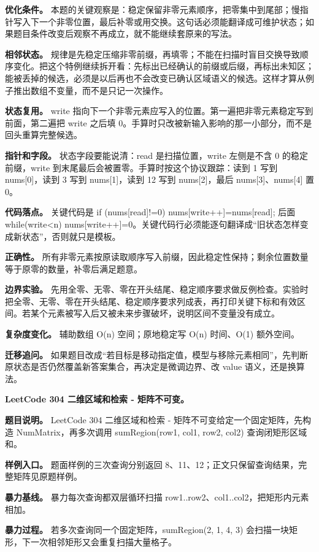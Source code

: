 \textbf{优化条件。} 本题的关键观察是：稳定保留非零元素顺序，把零集中到尾部；慢指针写入下一个非零位置，最后补零或用交换。这句话必须能翻译成可维护状态；如果题目条件改变后观察不再成立，就不能继续套原来的写法。

\textbf{相邻状态。} 规律是先稳定压缩非零前缀，再填零；不能在扫描时盲目交换导致顺序变化。把这个特例继续拆开看：先标出已经确认的前缀或后缀，再标出未知区；能被丢掉的候选，必须是以后再也不会改变已确认区域语义的候选。这样才算从例子推出数组不变量，而不是只记一次操作。

\textbf{状态复用。} write 指向下一个非零元素应写入的位置。第一遍把非零元素稳定写到前面，第二遍把 write 之后填 0。手算时只改被新输入影响的那一小部分，而不是回头重算完整候选。

\textbf{指针和字段。} 状态字段要能说清：read 是扫描位置，write 左侧是不含 0 的稳定前缀，write 到末尾最后会被置零。手算时按这个协议跟踪：读到 1 写到 nums[0]，读到 3 写到 nums[1]，读到 12 写到 nums[2]，最后 nums[3]、nums[4] 置 0。

\textbf{代码落点。} 关键代码是 if (nums[read]!=0) nums[write++]=nums[read]; 后面 while(write<n) nums[write++]=0。关键代码行必须能逐句翻译成“旧状态怎样变成新状态”，否则就只是模板。

\textbf{正确性。} 所有非零元素按原读取顺序写入前缀，因此稳定性保持；剩余位置数量等于原零的数量，补零后满足题意。

\textbf{边界实验。} 先用全零、无零、零在开头结尾、稳定顺序要求做反例检查。实验时把全零、无零、零在开头结尾、稳定顺序要求列成表，再打印关键下标和有效区间。若某个元素被写入后又被未来步骤破坏，说明区间不变量没有成立。

\textbf{复杂度变化。} 辅助数组 O(n) 空间；原地稳定写 O(n) 时间、O(1) 额外空间。

\textbf{迁移追问。} 如果题目改成“若目标是移动指定值，模型与移除元素相同”，先判断原状态是否仍然覆盖新答案集合，再决定是微调边界、改 value 语义，还是换算法。

\noindent\textbf{LeetCode 304 二维区域和检索 - 矩阵不可变。}

\textbf{题目说明。} LeetCode 304 二维区域和检索 - 矩阵不可变给定一个固定矩阵，先构造 NumMatrix，再多次调用 sumRegion(row1, col1, row2, col2) 查询闭矩形区域和。

\textbf{样例入口。} 题面样例的三次查询分别返回 8、11、12；正文只保留查询结果，完整矩阵见原题样例。

\textbf{暴力基线。} 暴力每次查询都双层循环扫描 row1..row2、col1..col2，把矩形内元素相加。

\textbf{暴力过程。} 若多次查询同一个固定矩阵，sumRegion(2, 1, 4, 3) 会扫描一块矩形，下一次相邻矩形又会重复扫描大量格子。

